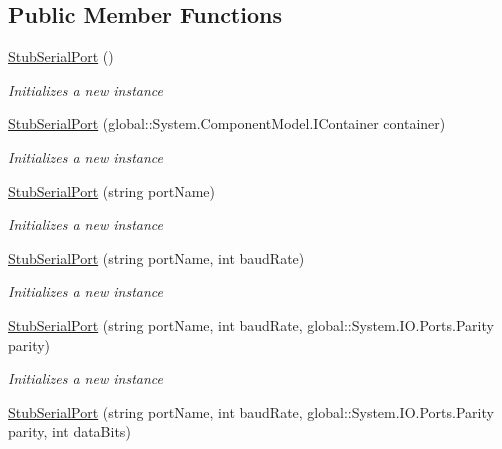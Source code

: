 \subsection*{Public Member Functions}
\begin{DoxyCompactItemize}
\item 
\hyperlink{class_system_1_1_i_o_1_1_ports_1_1_fakes_1_1_stub_serial_port_aef9c3d68a2839e29da218ddb5e654820}{Stub\-Serial\-Port} ()
\begin{DoxyCompactList}\small\item\em Initializes a new instance\end{DoxyCompactList}\item 
\hyperlink{class_system_1_1_i_o_1_1_ports_1_1_fakes_1_1_stub_serial_port_a6b6ce88020fc3ffda611beefca28e37e}{Stub\-Serial\-Port} (global\-::\-System.\-Component\-Model.\-I\-Container container)
\begin{DoxyCompactList}\small\item\em Initializes a new instance\end{DoxyCompactList}\item 
\hyperlink{class_system_1_1_i_o_1_1_ports_1_1_fakes_1_1_stub_serial_port_a28f0a85cbe7bd4c923d6fc96a7cc7077}{Stub\-Serial\-Port} (string port\-Name)
\begin{DoxyCompactList}\small\item\em Initializes a new instance\end{DoxyCompactList}\item 
\hyperlink{class_system_1_1_i_o_1_1_ports_1_1_fakes_1_1_stub_serial_port_a07dfc1aeafa4eb0d4a724b468031b834}{Stub\-Serial\-Port} (string port\-Name, int baud\-Rate)
\begin{DoxyCompactList}\small\item\em Initializes a new instance\end{DoxyCompactList}\item 
\hyperlink{class_system_1_1_i_o_1_1_ports_1_1_fakes_1_1_stub_serial_port_af843f361fcf3d85ed37ae5fea6fbc656}{Stub\-Serial\-Port} (string port\-Name, int baud\-Rate, global\-::\-System.\-I\-O.\-Ports.\-Parity parity)
\begin{DoxyCompactList}\small\item\em Initializes a new instance\end{DoxyCompactList}\item 
\hyperlink{class_system_1_1_i_o_1_1_ports_1_1_fakes_1_1_stub_serial_port_a80f1b8b7af65c2e17ece31a7559e0798}{Stub\-Serial\-Port} (string port\-Name, int baud\-Rate, global\-::\-System.\-I\-O.\-Ports.\-Parity parity, int data\-Bits)

\end{DoxyCompactItemize}
